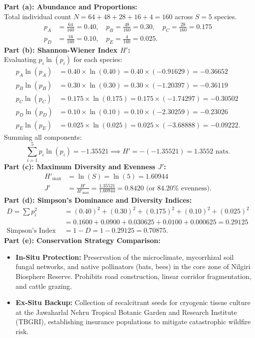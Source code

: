 \begin{solbox}
\textbf{Part (a): Abundance and Proportions:}\\Total individual count $N = 64 + 48 + 28 + 16 + 4 = 160$ across $S = 5$ species.\begin{align*}p_A &= \frac{64}{160} = 0.40, \quad p_B = \frac{48}{160} = 0.30, \quad p_C = \frac{28}{160} = 0.175 \\p_D &= \frac{16}{160} = 0.10, \quad p_E = \frac{4}{160} = 0.025.\end{align*}\textbf{Part (b): Shannon-Wiener Index $H'$:}\\Evaluating $p_i \ln(p_i)$ for each species:\begin{align*}p_A \ln(p_A) &= 0.40 \times \ln(0.40) = 0.40 \times (-0.91629) = -0.36652 \\p_B \ln(p_B) &= 0.30 \times \ln(0.30) = 0.30 \times (-1.20397) = -0.36119 \\p_C \ln(p_C) &= 0.175 \times \ln(0.175) = 0.175 \times (-1.74297) = -0.30502 \\p_D \ln(p_D) &= 0.10 \times \ln(0.10) = 0.10 \times (-2.30259) = -0.23026 \\p_E \ln(p_E) &= 0.025 \times \ln(0.025) = 0.025 \times (-3.68888) = -0.09222.\end{align*}Summing all components:\begin{equation*}\sum_{i=1}^5 p_i \ln(p_i) = -1.35521 \implies H' = -(-1.35521) = 1.3552\text{ nats}.\end{equation*}\textbf{Part (c): Maximum Diversity and Evenness $J'$:}\\\begin{align*}H'_{\text{max}} &= \ln(S) = \ln(5) = 1.60944 \\J' &= \frac{H'}{H'_{\text{max}}} = \frac{1.35521}{1.60944} = 0.8420\text{ (or } 84.20\%\text{ evenness)}.\end{align*}\textbf{Part (d): Simpson's Dominance and Diversity Indices:}\\\begin{align*}D = \sum p_i^2 &= (0.40)^2 + (0.30)^2 + (0.175)^2 + (0.10)^2 + (0.025)^2 \\&= 0.1600 + 0.0900 + 0.030625 + 0.0100 + 0.000625 = 0.29125 \\\text{Simpson's Index of Diversity} &= 1 - D = 1 - 0.29125 = 0.70875.\end{align*}\textbf{Part (e): Conservation Strategy Comparison:}\\\begin{itemize}[leftmargin=1.5em]  \item \textbf{In-Situ Protection:} Preservation of the microclimate, mycorrhizal soil fungal networks, and native pollinators (bats, bees) in the core zone of Nilgiri Biosphere Reserve. Prohibits road construction, linear corridor fragmentation, and cattle grazing.  \item \textbf{Ex-Situ Backup:} Collection of recalcitrant seeds for cryogenic tissue culture at the Jawaharlal Nehru Tropical Botanic Garden and Research Institute (TBGRI), establishing insurance populations to mitigate catastrophic wildfire risk.\end{itemize}
\end{solbox}

